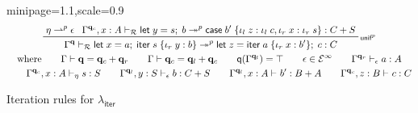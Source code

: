 \documentclass[acmsmall,screen,anonymous,review]{acmart}
\newcommand{\mc}[1]{\ensuremath{\mathcal{#1}}}
\newcommand{\mb}[1]{\ensuremath{\mathbf{#1}}}
\newcommand{\ms}[1]{\ensuremath{\mathsf{#1}}}
\newcommand{\lto}{:}
\newcommand{\linl}[1]{\iota_l\;{#1}}
\newcommand{\linr}[1]{\iota_r\;{#1}}
\newcommand{\letexpr}[3]{\ensuremath{\ms{let}\;#1 = #2;\;#3}}
\newcommand{\caseexpr}[5]{\ms{case}\;#1\;\{\linl{#2} \lto #3, \linr{#4} \lto #5\}}
\newcommand{\liter}[3]{\ms{iter}\;#1\;\{ \linr{#2} \lto #3 \}}
\newcommand{\einf}[1]{#1 \in \mc{E}^\infty}
\newcommand{\qsp}[4]{#1 \vdash #2 = #3 + #4}
\newcommand{\rle}[1]{{\scriptsize\textsf{#1}}}
\newcommand{\hasty}[4]{#1 \vdash_{#2} #3: {#4}}
\newcommand{\tref}{\twoheadrightarrow}
\newcommand{\tmlep}[6]{#1 \vdash_{#2} #3 \tref^{#6} #4 : {#5}}
\newcommand{\subiterexp}{\texorpdfstring{\(\lambda_{\ms{iter}}\)}{lambda-iter}}
\newcommand{\rightmove}{\rightharpoonup}
\newcommand{\alquant}{\ms{q}}
\begin{document}
\begin{figure}
\begin{adjustbox}{minipage=1.1\textwidth,scale=0.9}
  \begin{gather*}
    \prftree[r]{\rle{unif$^p$}}
      {\eta \rightmove^p \epsilon}
      {\tmlep{\Gamma^{\mb{q}_c}, x : A}{\mc{R}}
        {\letexpr{y}{s}{b}}
        {\caseexpr{b'}{z}{\linl{c}}{x}{\linr{s}}}{C + S}{p}}
      {
        \tmlep{\Gamma^{\mb{q}}}
          {\mc{R}}
          {\letexpr{x}{a}{\liter{s}{y}{b}}}
          {\letexpr{z}{\liter{a}{x}{b'}}{c}}
          {C}
          {p}
      } \\
    \text{where} \qquad {\qsp{\Gamma}{\mb{q}}{\mb{q}_c}{\mb{q}_r}} \qquad
    {\qsp{\Gamma}{\mb{q}_c}{\mb{q}_l}{\mb{q}_c}} \qquad
    \alquant(\Gamma^{\mb{q}_l}) = \top \qquad
    \einf{\epsilon} \qquad
    {\hasty{\Gamma^{\mb{q}_r}}{\epsilon}{a}{A}}
    \\
    \qquad {\hasty{\Gamma^{\mb{q}_c}, x : A}{\eta}{s}{S}}
    \qquad {\hasty{\Gamma^{\mb{q}_l}, y : S}{\epsilon}{b}{C + S}}
    \qquad {\hasty{\Gamma^{\mb{q}_l}, x : A}{}{b'}{B + A}}
    \qquad {\hasty{\Gamma^{\mb{q}_c}, z : B}{}{c}{C}}
  \end{gather*} 
  \end{adjustbox}
  \caption{Iteration rules for \subiterexp{}}
  \Description{}
  \label{fig:iteration-rules}
\end{figure}
\end{document}
